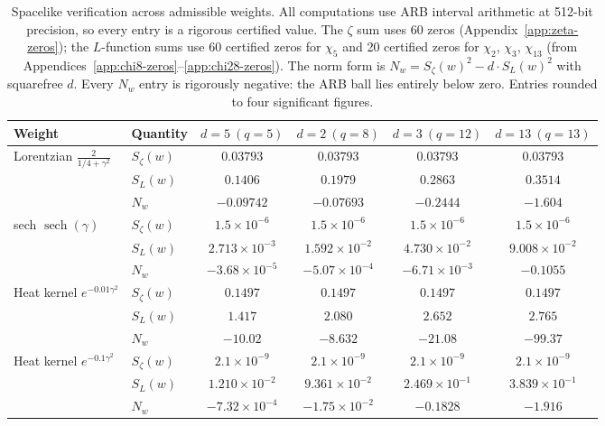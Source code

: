\documentclass[12pt,reqno]{amsart}
\theoremstyle{plain}
\theoremstyle{definition}
\theoremstyle{remark}
\begin{document}
\begin{table}[ht]
\centering
\caption{Spacelike verification across admissible weights.  All computations use ARB interval arithmetic at 512-bit precision, so every entry is a rigorous certified value.  The $\zeta$ sum uses 60 zeros (Appendix~\ref{app:zeta-zeros}); the $L$-function sums use 60 certified zeros for $\chi_5$ and 20 certified zeros for $\chi_2$, $\chi_3$, $\chi_{13}$ (from Appendices~\ref{app:chi8-zeros}--\ref{app:chi28-zeros}).  The norm form is $N_w = S_\zeta(w)^2 - d\cdot S_L(w)^2$ with squarefree $d$.  Every $N_w$ entry is rigorously negative: the ARB ball lies entirely below zero.  Entries rounded to four significant figures.}
\label{tab:weights}
\begin{tabular}{llcccc}
\hline
Weight & Quantity & $d = 5\ (q = 5)$ & $d = 2\ (q = 8)$ & $d = 3\ (q = 12)$ & $d = 13\ (q = 13)$ \\
\hline
\multirow{3}{*}{Lorentzian $\frac{2}{1/4+\gamma^2}$}
  & $S_\zeta(w)$ & $0.03793$ & $0.03793$ & $0.03793$ & $0.03793$ \\
  & $S_L(w)$     & $0.1406$ & $0.1979$ & $0.2863$ & $0.3514$ \\
  & $N_w$        & $-0.09742$ & $-0.07693$ & $-0.2444$ & $-1.604$ \\[4pt]
\multirow{3}{*}{sech $\operatorname{sech}(\gamma)$}
  & $S_\zeta(w)$ & $1.5\times 10^{-6}$ & $1.5\times 10^{-6}$ & $1.5\times 10^{-6}$ & $1.5\times 10^{-6}$ \\
  & $S_L(w)$     & $2.713\times 10^{-3}$ & $1.592\times 10^{-2}$ & $4.730\times 10^{-2}$ & $9.008\times 10^{-2}$ \\
  & $N_w$        & $-3.68\times 10^{-5}$ & $-5.07\times 10^{-4}$ & $-6.71\times 10^{-3}$ & $-0.1055$ \\[4pt]
\multirow{3}{*}{Heat kernel $e^{-0.01\gamma^2}$}
  & $S_\zeta(w)$ & $0.1497$ & $0.1497$ & $0.1497$ & $0.1497$ \\
  & $S_L(w)$     & $1.417$ & $2.080$ & $2.652$ & $2.765$ \\
  & $N_w$        & $-10.02$ & $-8.632$ & $-21.08$ & $-99.37$ \\[4pt]
\multirow{3}{*}{Heat kernel $e^{-0.1\gamma^2}$}
  & $S_\zeta(w)$ & $2.1\times 10^{-9}$ & $2.1\times 10^{-9}$ & $2.1\times 10^{-9}$ & $2.1\times 10^{-9}$ \\
  & $S_L(w)$     & $1.210\times 10^{-2}$ & $9.361\times 10^{-2}$ & $2.469\times 10^{-1}$ & $3.839\times 10^{-1}$ \\
  & $N_w$        & $-7.32\times 10^{-4}$ & $-1.75\times 10^{-2}$ & $-0.1828$ & $-1.916$ \\
\hline
\end{tabular}
\end{table}
\end{document}
